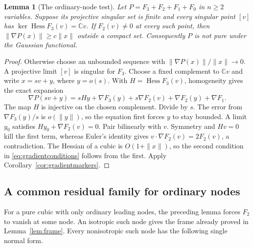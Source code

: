 \documentclass[11pt]{article}
\newtheorem{lemma}[theorem]{Lemma}
\theoremstyle{definition}\newtheorem{definition}[theorem]{Definition}
\theoremstyle{remark}\newtheorem{remark}[theorem]{Remark}
\newcommand{\C}{\mathbb C}
\begin{document}
\begin{lemma}[The ordinary-node test]\label{lem:nodecoercivity}
Let $P=F_3+F_2+F_1+F_0$ in $n\geq2$ variables. Suppose its
projective singular set is finite and every singular point $[v]$
has $\ker\operatorname{Hess}F_3(v)=\C v$. If $F_2(v)\ne0$ at
every such point, then
$\|\nabla P(x)\|\geq c\|x\|$ outside a compact set. Consequently
$P$ is not pure under the Gaussian functional.
\end{lemma}
\begin{proof}
Otherwise choose an unbounded sequence with
$\|\nabla P(x)\|/\|x\|\longrightarrow0$. A projective limit $[v]$
is singular for $F_3$. Choose a fixed complement to $\C v$ and write
$x=sv+y$, where $y=o(s)$. With $H=\operatorname{Hess}F_3(v)$,
homogeneity gives the exact expansion
\[
 \nabla P(sv+y)=sHy+\nabla F_3(y)+s\nabla F_2(v)
                              +\nabla F_2(y)+\nabla F_1.
\]
The map $H$ is injective on the chosen complement. Divide by $s$.
The error from $\nabla F_3(y)/s$ is $o(\|y\|)$, so the equation
first forces $y$ to stay bounded. A limit $y_0$ satisfies
$Hy_0+\nabla F_2(v)=0$. Pair bilinearly with $v$. Symmetry and
$Hv=0$ kill the first term, whereas Euler's identity gives
$v\cdot\nabla F_2(v)=2F_2(v)$, a contradiction.
The Hessian of a cubic is $O(1+\|x\|)$, so the second condition
in \eqref{eq:gradientconditions} follows from the first. Apply
Corollary~\ref{cor:gradientmarkers}.
\end{proof}

\subsection{A common residual family for ordinary nodes}
\label{sec:ordinaryresidual}

For a pure cubic with only ordinary leading nodes, the preceding
lemma forces $F_2$ to vanish at some node. An isotropic such node
gives the frame already proved in Lemma~\ref{lem:frame}. Every
nonisotropic such node has the following single normal form.
\end{document}
